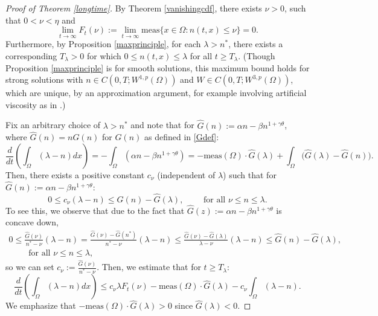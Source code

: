 \documentclass[12pt]{article}
\theoremstyle{plain}
\begin{document}
\begin{proof}[Proof of Theorem \ref{longtime}]

By Theorem \ref{vanishingcdf}, there exists $\nu > 0$, such that $0 < \nu < \eta$ and 
\begin{equation}\label{nuresult}
\lim_{t \to \infty} F_{t}(\nu) := \lim_{t \to \infty} \text{meas}\{x \in \Omega : n(t, x) \le \nu\} = 0.
\end{equation}
Furthermore, by Proposition \ref{maxprinciple}, for each $\lambda > n^{*}$, there exists a corresponding $T_{\lambda} > 0$ for which $0 \le n(t, x) \le \lambda$ for all $t \ge T_{\lambda}$. (Though Proposition \ref{maxprinciple} is for smooth solutions, this maximum bound holds for strong solutions with $n \in C(0, T; W^{1, p}(\Omega))$ and $W \in C(0, T; W^{3, p}(\Omega))$, which are unique, by an approximation argument, for example involving artificial viscosity as in \cite{WeberTrivisa, TrivisaWeberDrug}.)

Fix an arbitrary choice of $\lambda > n^{*}$ and note that for $\hat{G}(n) := \alpha n - \beta n^{1 + \gamma \theta}$, where $\hat{G}(n) = nG(n)$ for $G(n)$ as defined in \eqref{Gdef}:
\begin{equation*}
\frac{d}{dt}\left(\int_{\Omega} (\lambda - n) dx \right) = -\int_{\Omega} (\alpha n - \beta n^{1 + \gamma \theta}) = -\text{meas}(\Omega) \cdot \hat{G}(\lambda) + \int_{\Omega} \Big(\hat{G}(\lambda) - \hat{G}(n)\Big). 
\end{equation*}
Then, there exists a positive constant $c_{\nu}$ (independent of $\lambda$) such that for $\hat{G}(n) := \alpha n - \beta n^{1 + \gamma \theta}$:
\begin{equation}\label{lipG}
0 \le c_{\nu}(\lambda - n) \le \hat{G}(n) - \hat{G}(\lambda), \qquad \text{ for all } \nu \le n \le \lambda.
\end{equation}
To see this, we observe that due to the fact that $\hat{G}(z) := \alpha n - \beta n^{1 + \gamma \theta}$ is concave down, 
\begin{multline*}
0 \le \frac{\hat{G}(\nu)}{n^{*} - \nu}(\lambda - n) = \frac{\hat{G}(\nu) - \hat{G}(n^{*})}{n^{*} - \nu}(\lambda - n) \le \frac{\hat{G}(\nu) - \hat{G}(\lambda)}{\lambda - \nu}(\lambda - n) \le \hat{G}(n) - \hat{G}(\lambda), \\
\qquad \text{ for all } \nu \le n \le \lambda,
\end{multline*}
so we can set $\displaystyle c_{\nu} := \frac{\hat{G}(\nu)}{n^{*} - \nu}$. Then, we estimate that for $t \ge T_{\lambda}$:
\begin{equation}\label{Tlambdadiff}
\frac{d}{dt}\left(\int_{\Omega} (\lambda - n) dx\right) \le c_{\nu} \lambda F_{t}(\nu) - \text{meas}(\Omega) \cdot \hat{G}(\lambda) -c_{\nu}\int_{\Omega} (\lambda - n).
\end{equation}
We emphasize that $-\text{meas}(\Omega) \cdot \hat{G}(\lambda) > 0$ since $\hat{G}(\lambda) < 0$.


\end{proof}
\end{document}
